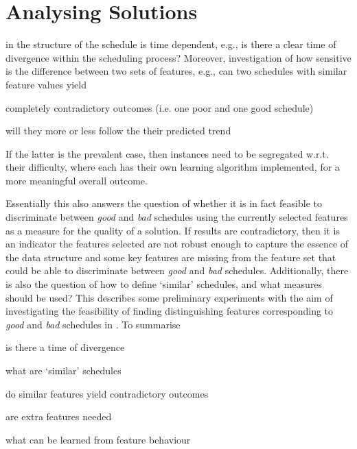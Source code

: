 
\chapter{Analysing Solutions}\label{ch:analysingsol} 

 in the structure 
of the schedule is time dependent, e.g.,  is there a clear time of divergence 
within the scheduling process? 
Moreover, investigation of how sensitive is the difference between two sets of 
features, e.g., can two schedules with similar feature values yield 
\begin{enumerate*}[itemjoin={{? }}, itemjoin*={{? Or }}, after={{? }}]
    \item completely contradictory outcomes (i.e. one poor and one good 
    schedule)
    \item will they more or less follow the their predicted trend
\end{enumerate*}
If the latter is the prevalent case, then instances need to be segregated 
w.r.t. their difficulty, where each has their own learning algorithm 
implemented, for a more meaningful overall outcome.  

Essentially this also answers the question of whether  it is in fact feasible 
to discriminate between \emph{good} and \emph{bad} schedules using the 
currently selected features as a measure for the quality of a solution. 
If results are contradictory, then it is an indicator the features selected are 
not robust enough to capture the essence of the data structure and some key 
features are missing from the feature set that could be able to discriminate 
between \emph{good} and \emph{bad} schedules. 
Additionally, there is also the question of how to define `similar'
schedules, and what measures should be used? This 
 describes some preliminary experiments with 
the aim of investigating the feasibility of finding distinguishing features 
corresponding to \emph{good} and \emph{bad} schedules in \jsp. To summarise
\begin{enumerate*}[itemjoin={{? }}, itemjoin*={{? And }}, after={{? }}]
    \item is there a time of divergence
    \item what are `similar' schedules
    \item do similar features yield contradictory outcomes
    \item are extra features needed
    \item what can be learned from feature behaviour
\end{enumerate*}

